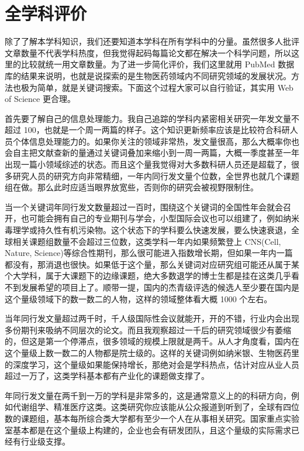 \documentclass[]{tufte-book}
\begin{document}
\hypertarget{ux5168ux5b66ux79d1ux8bc4ux4ef7}{%
\section{全学科评价}\label{ux5168ux5b66ux79d1ux8bc4ux4ef7}}

除了了解本学科知识，我们还要知道本学科在所有学科中的分量。虽然很多人批评文章数量不代表学科热度，但我觉得起码每篇论文都在解决一个科学问题，所以这里的比较就统一用文章数量。为了进一步简化评价，我们这里就用 PubMed 数据库的结果来说明，也就是说探索的是生物医药领域内不同研究领域的发展状况。方法也极为简单，就是关键词搜索。下面这个过程大家可以自行验证，其实用 Web of Science 更合理。

首先要了解自己的信息处理能力。我自己追踪的学科内紧密相关研究一年发文量不超过 100，也就是一个周一两篇的样子。这个知识更新频率应该是比较符合科研人员个体信息处理能力的。如果你关注的领域非常热，发文量很高，那么大概率你也会自主把文献查新的量通过关键词叠加来缩小到一周一两篇，大概一季度甚至一年出现一篇小领域综述的状态。而且这个量我觉得对大多数科研人员还是超载了，很多研究人员的研究方向非常精细，一年内同行发文量个位数，全世界也就几个课题组在做。那么此时应适当眼界放宽些，否则你的研究会被视野限制住。

当一个关键词年同行发文数量超过一百时，围绕这个关键词的全国性年会就会召开，也可能会拥有自己的专业期刊与学会，小型国际会议也可以组建了，例如纳米毒理学或持久性有机污染物。这个状态下的学科要么快速发展，要么快速衰退，全球相关课题组数量不会超过三位数，这类学科一年内如果频繁登上 CNS(Cell, Nature, Science)等综合性期刊，那么很可能进入指数增长期，但如果一年内一篇都没有，那消退也很快。如果低于这个量，那么关键词对应研究组可能还从属于某个大学科，属于大课题下的边缘课题，绝大多数退学的博士生都是挂在这类几乎看不到发展希望的项目上了。顺带一提，国内的杰青级评选的候选人至少要在国内是这个量级领域下的数一数二的人物，这样的领域整体看大概 1000 个左右。

当年同行发文量超过两千时，千人级国际性会议就能开，开的不错，行业内会出现多份期刊来吸纳不同层次的论文。而且我观察超过一千后的研究领域很少有萎缩的，但这是第一个停滞点，很多领域的规模上限就是两千。从人才角度看，国内在这个量级上数一数二的人物都是院士级的。这样的关键词例如纳米银、生物医药里的深度学习，这个量级如果能保持增长，那绝对会是学科热点，估计对应从业人员超过一万了，这类学科基本都有产业化的课题做支撑了。

年同行发文量在两千到一万的学科是非常多的，这是通常意义上的的科研方向，例如代谢组学、精准医疗这类。这类研究你应该能从公众报道到听到了，全球有四位数的课题组，基本每所综合类大学都有至少一个人在从事相关研究。国家重点实验室基本都是在这个量级上构建的，企业也会有研发团队，且这个量级的实际需求已经有行业级支撑。
\end{document}
